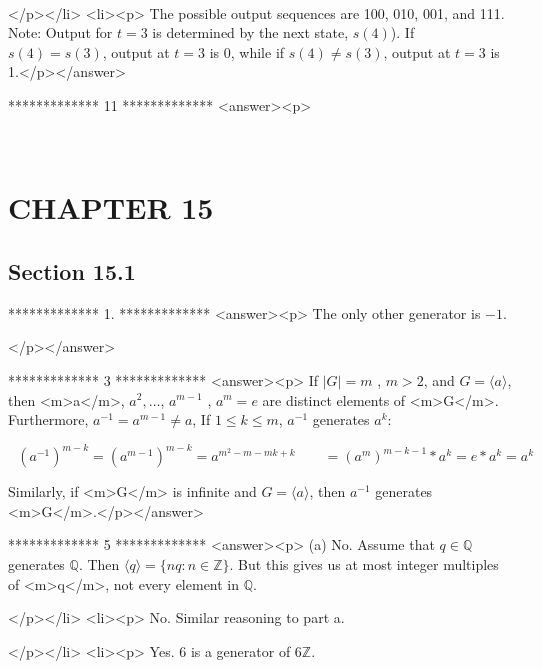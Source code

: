 \begin{doublespace}
\noindent\(\pmb{}\)
\end{doublespace}

</p></li>
<li><p> The possible output sequences are 100, 010, 001, and 111. Note: Output for \(t = 3\) is determined by the next state, \(s(4)\)). If \(s(4) =
s(3)\), output at \(t = 3\) is 0, while if \(s(4) \neq  s(3)\), output at \(t=3\) is 1.</p></answer>


*************
11
*************
<answer><p>

\begin{doublespace}
\noindent\(\)
\end{doublespace}


\section{CHAPTER 15}


\subsection{Section 15.1}

*************
1.
*************
<answer><p>  The only other generator is \(-1\).

</p></answer>


*************
3
*************
<answer><p>  If  \(\left| G\right| =m\)  , \(m>2\), and \(G = \langle a\rangle\), then <m>a</m>, \(a^2,\ldots\), \(a^{m-1}\) , \(a^m=e\) are distinct
elements of <m>G</m>. Furthermore, \(a^{-1}= a^{m-1}\neq a\),  If \(1\leq k\leq m\),  \(a^{-1}\) generates \(a^k\):



   \(\text{               }\left(a^{-1}\right)^{m-k}= \left(a^{m-1}\right)^{m-k}= a^{m^2-m-m k + k}\quad \quad =\left(a^m\right)^{m-k-1}*a^k=
e*a^k=a^k\)



Similarly, if <m>G</m> is infinite and \(G = \langle a\rangle\), then \(a^{-1}\) generates <m>G</m>.</p></answer>


*************
5
*************
<answer><p> (a) No. Assume that \(q \in \mathbb{Q}\) generates $\mathbb{Q}$. Then \(\langle q\rangle  = \{n q : n \in \mathbb{Z}\}\). But this gives us at
most integer multiples of <m>q</m>, not every element in $\mathbb{Q}$.

</p></li>
<li><p> No. Similar reasoning to part a.

</p></li>
<li><p> Yes. 6 is a generator of \(6\mathbb{Z}\).

